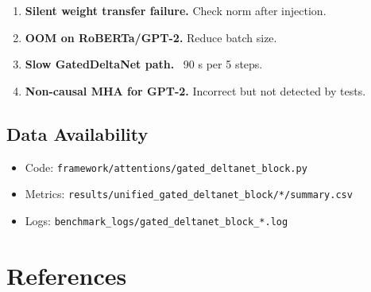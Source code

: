 \begin{enumerate}
\item \textbf{Silent weight transfer failure.} Check norm after injection.
\item \textbf{OOM on RoBERTa/GPT-2.} Reduce batch size.
\item \textbf{Slow GatedDeltaNet path.} ~90 s per 5 steps.
\item \textbf{Non-causal MHA for GPT-2.} Incorrect but not detected by tests.

\end{enumerate}
\subsection{Data Availability}

\begin{itemize}
\item Code: \texttt{framework/attentions/gated\_deltanet\_block.py}
\item Metrics: \texttt{results/unified\_gated\_deltanet\_block/*/summary.csv}
\item Logs: \texttt{benchmark\_logs/gated\_deltanet\_block\_*.log}

\end{itemize}



\section{References}

